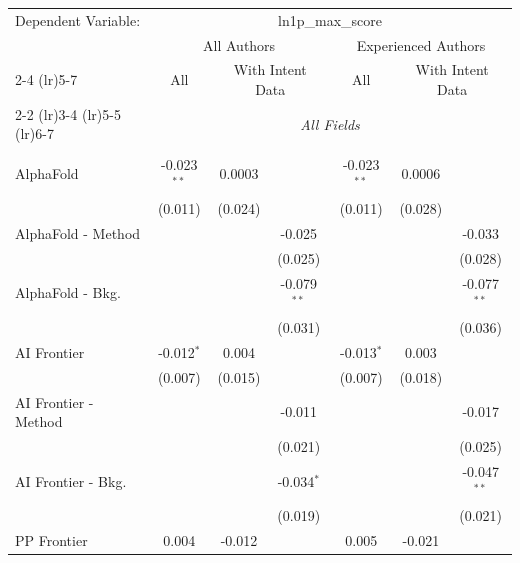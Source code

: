 \begingroup
\centering
\begin{tabular}{lcccccc}
   \tabularnewline \midrule \midrule
   Dependent Variable: & \multicolumn{6}{c}{ln1p\_max\_score}\\
 & \multicolumn{3}{c}{All Authors} & \multicolumn{3}{c}{Experienced Authors} \\
\cmidrule(lr){2-4} \cmidrule(lr){5-7}
 & \multicolumn{1}{c}{All} & \multicolumn{2}{c}{With Intent Data} & \multicolumn{1}{c}{All} & \multicolumn{2}{c}{With Intent Data} \\
\cmidrule(lr){2-2} \cmidrule(lr){3-4} \cmidrule(lr){5-5} \cmidrule(lr){6-7}
 & \multicolumn{6}{c}{\textit{All Fields}} \\ \\
   AlphaFold            & -0.023$^{**}$ & 0.0003  &               & -0.023$^{**}$ & 0.0006  &   \\   
                        & (0.011)       & (0.024) &               & (0.011)       & (0.028) &   \\   
   AlphaFold - Method   &               &         & -0.025        &               &         & -0.033\\   
                        &               &         & (0.025)       &               &         & (0.028)\\   
   AlphaFold - Bkg.     &               &         & -0.079$^{**}$ &               &         & -0.077$^{**}$\\   
                        &               &         & (0.031)       &               &         & (0.036)\\   
   AI Frontier          & -0.012$^{*}$  & 0.004   &               & -0.013$^{*}$  & 0.003   &   \\   
                        & (0.007)       & (0.015) &               & (0.007)       & (0.018) &   \\   
   AI Frontier - Method &               &         & -0.011        &               &         & -0.017\\   
                        &               &         & (0.021)       &               &         & (0.025)\\   
   AI Frontier - Bkg.   &               &         & -0.034$^{*}$  &               &         & -0.047$^{**}$\\   
                        &               &         & (0.019)       &               &         & (0.021)\\   
   PP Frontier          & 0.004         & -0.012  &               & 0.005         & -0.021  &   \\   

\end{tabular}
